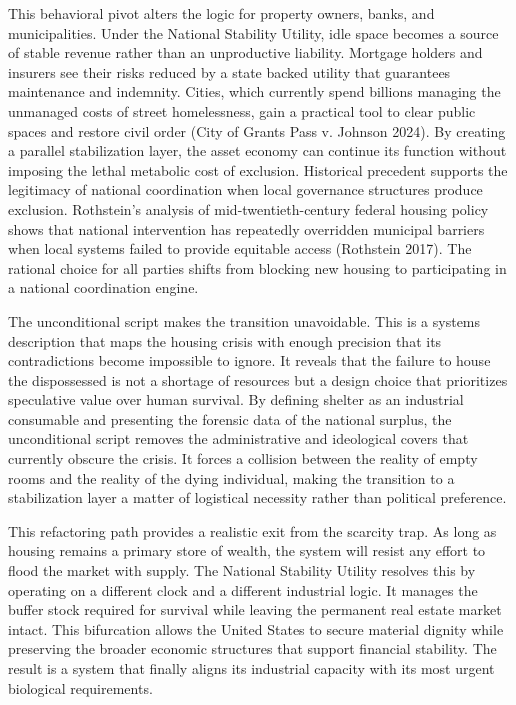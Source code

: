 \documentclass[
  12pt,
]{article}
\begin{document}
This behavioral pivot alters the logic for property owners, banks, and municipalities. Under the National Stability Utility, idle space becomes a source of stable revenue rather than an unproductive liability. Mortgage holders and insurers see their risks reduced by a state backed utility that guarantees maintenance and indemnity. Cities, which currently spend billions managing the unmanaged costs of street homelessness, gain a practical tool to clear public spaces and restore civil order (City of Grants Pass v. Johnson 2024). By creating a parallel stabilization layer, the asset economy can continue its function without imposing the lethal metabolic cost of exclusion. Historical precedent supports the legitimacy of national coordination when local governance structures produce exclusion. Rothstein's analysis of mid-twentieth-century federal housing policy shows that national intervention has repeatedly overridden municipal barriers when local systems failed to provide equitable access (Rothstein 2017). The rational choice for all parties shifts from blocking new housing to participating in a national coordination engine.

The unconditional script makes the transition unavoidable. This is a systems description that maps the housing crisis with enough precision that its contradictions become impossible to ignore. It reveals that the failure to house the dispossessed is not a shortage of resources but a design choice that prioritizes speculative value over human survival. By defining shelter as an industrial consumable and presenting the forensic data of the national surplus, the unconditional script removes the administrative and ideological covers that currently obscure the crisis. It forces a collision between the reality of empty rooms and the reality of the dying individual, making the transition to a stabilization layer a matter of logistical necessity rather than political preference.

This refactoring path provides a realistic exit from the scarcity trap. As long as housing remains a primary store of wealth, the system will resist any effort to flood the market with supply. The National Stability Utility resolves this by operating on a different clock and a different industrial logic. It manages the buffer stock required for survival while leaving the permanent real estate market intact. This bifurcation allows the United States to secure material dignity while preserving the broader economic structures that support financial stability. The result is a system that finally aligns its industrial capacity with its most urgent biological requirements.
\end{document}
